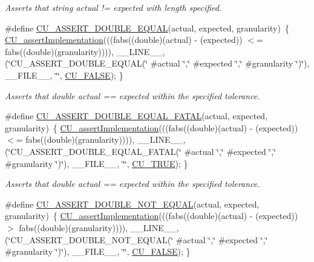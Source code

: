 \begin{DoxyCompactItemize}
\begin{DoxyCompactList}\small\item\em Asserts that string actual != expected with length specified. \end{DoxyCompactList}\item 
\#define \hyperlink{group__Framework_ga8ac0c06b5f46fe924aafad37e40fa46d}{C\-U\-\_\-\-A\-S\-S\-E\-R\-T\-\_\-\-D\-O\-U\-B\-L\-E\-\_\-\-E\-Q\-U\-A\-L}(actual, expected, granularity)~\{ \hyperlink{group__Framework_ga31a858e8b496b2af992b63902064c5fa}{C\-U\-\_\-assert\-Implementation}(((fabs((double)(actual) -\/ (expected)) $<$= fabs((double)(granularity)))), \-\_\-\-\_\-\-L\-I\-N\-E\-\_\-\-\_\-, (\char`\"{}C\-U\-\_\-\-A\-S\-S\-E\-R\-T\-\_\-\-D\-O\-U\-B\-L\-E\-\_\-\-E\-Q\-U\-A\-L(\char`\"{} \#actual \char`\"{},\char`\"{}  \#expected \char`\"{},\char`\"{} \#granularity \char`\"{})\char`\"{}), \-\_\-\-\_\-\-F\-I\-L\-E\-\_\-\-\_\-, \char`\"{}\char`\"{}, \hyperlink{group__Framework_ga7453214541b156ef868681eaafe60860}{C\-U\-\_\-\-F\-A\-L\-S\-E}); \}
\begin{DoxyCompactList}\small\item\em Asserts that double actual == expected within the specified tolerance. \end{DoxyCompactList}\item 
\#define \hyperlink{group__Framework_gadf7c38041d5b97f69727b434c6fd88f5}{C\-U\-\_\-\-A\-S\-S\-E\-R\-T\-\_\-\-D\-O\-U\-B\-L\-E\-\_\-\-E\-Q\-U\-A\-L\-\_\-\-F\-A\-T\-A\-L}(actual, expected, granularity)~\{ \hyperlink{group__Framework_ga31a858e8b496b2af992b63902064c5fa}{C\-U\-\_\-assert\-Implementation}(((fabs((double)(actual) -\/ (expected)) $<$= fabs((double)(granularity)))), \-\_\-\-\_\-\-L\-I\-N\-E\-\_\-\-\_\-, (\char`\"{}C\-U\-\_\-\-A\-S\-S\-E\-R\-T\-\_\-\-D\-O\-U\-B\-L\-E\-\_\-\-E\-Q\-U\-A\-L\-\_\-\-F\-A\-T\-A\-L(\char`\"{} \#actual \char`\"{},\char`\"{}  \#expected \char`\"{},\char`\"{} \#granularity \char`\"{})\char`\"{}), \-\_\-\-\_\-\-F\-I\-L\-E\-\_\-\-\_\-, \char`\"{}\char`\"{}, \hyperlink{group__Framework_ga99641394bc766ca9c4a295e942fed1ef}{C\-U\-\_\-\-T\-R\-U\-E}); \}
\begin{DoxyCompactList}\small\item\em Asserts that double actual == expected within the specified tolerance. \end{DoxyCompactList}\item 
\#define \hyperlink{group__Framework_gaef75e3caa15492e72fab9f3b56795aea}{C\-U\-\_\-\-A\-S\-S\-E\-R\-T\-\_\-\-D\-O\-U\-B\-L\-E\-\_\-\-N\-O\-T\-\_\-\-E\-Q\-U\-A\-L}(actual, expected, granularity)~\{ \hyperlink{group__Framework_ga31a858e8b496b2af992b63902064c5fa}{C\-U\-\_\-assert\-Implementation}(((fabs((double)(actual) -\/ (expected)) $>$ fabs((double)(granularity)))), \-\_\-\-\_\-\-L\-I\-N\-E\-\_\-\-\_\-, (\char`\"{}C\-U\-\_\-\-A\-S\-S\-E\-R\-T\-\_\-\-D\-O\-U\-B\-L\-E\-\_\-\-N\-O\-T\-\_\-\-E\-Q\-U\-A\-L(\char`\"{} \#actual \char`\"{},\char`\"{}  \#expected \char`\"{},\char`\"{} \#granularity \char`\"{})\char`\"{}), \-\_\-\-\_\-\-F\-I\-L\-E\-\_\-\-\_\-, \char`\"{}\char`\"{}, \hyperlink{group__Framework_ga7453214541b156ef868681eaafe60860}{C\-U\-\_\-\-F\-A\-L\-S\-E}); \}

\end{DoxyCompactItemize}
